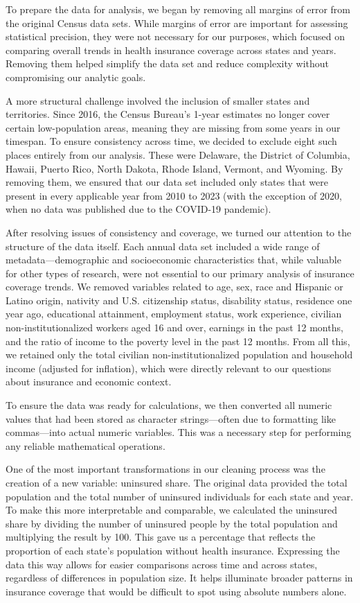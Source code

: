 \documentclass[
]{article}
\begin{document}
To prepare the data for analysis, we began by removing all margins of
error from the original Census data sets. While margins of error are
important for assessing statistical precision, they were not necessary
for our purposes, which focused on comparing overall trends in health
insurance coverage across states and years. Removing them helped
simplify the data set and reduce complexity without compromising our
analytic goals.

A more structural challenge involved the inclusion of smaller states and
territories. Since 2016, the Census Bureau's 1-year estimates no longer
cover certain low-population areas, meaning they are missing from some
years in our timespan. To ensure consistency across time, we decided to
exclude eight such places entirely from our analysis. These were
Delaware, the District of Columbia, Hawaii, Puerto Rico, North Dakota,
Rhode Island, Vermont, and Wyoming. By removing them, we ensured that
our data set included only states that were present in every applicable
year from 2010 to 2023 (with the exception of 2020, when no data was
published due to the COVID-19 pandemic).

After resolving issues of consistency and coverage, we turned our
attention to the structure of the data itself. Each annual data set
included a wide range of metadata---demographic and socioeconomic
characteristics that, while valuable for other types of research, were
not essential to our primary analysis of insurance coverage trends. We
removed variables related to age, sex, race and Hispanic or Latino
origin, nativity and U.S. citizenship status, disability status,
residence one year ago, educational attainment, employment status, work
experience, civilian non-institutionalized workers aged 16 and over,
earnings in the past 12 months, and the ratio of income to the poverty
level in the past 12 months. From all this, we retained only the total
civilian non-institutionalized population and household income (adjusted
for inflation), which were directly relevant to our questions about
insurance and economic context.

To ensure the data was ready for calculations, we then converted all
numeric values that had been stored as character strings---often due to
formatting like commas---into actual numeric variables. This was a
necessary step for performing any reliable mathematical operations.

One of the most important transformations in our cleaning process was
the creation of a new variable: uninsured share. The original data
provided the total population and the total number of uninsured
individuals for each state and year. To make this more interpretable and
comparable, we calculated the uninsured share by dividing the number of
uninsured people by the total population and multiplying the result by
100. This gave us a percentage that reflects the proportion of each
state's population without health insurance. Expressing the data this
way allows for easier comparisons across time and across states,
regardless of differences in population size. It helps illuminate
broader patterns in insurance coverage that would be difficult to spot
using absolute numbers alone.
\end{document}
